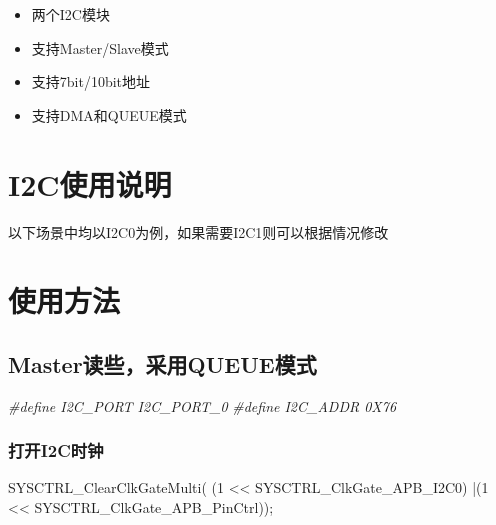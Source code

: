 \documentclass[
  12pt,
]{book}
\newenvironment{Shaded}{\begin{snugshade}}{\end{snugshade}}
\newcommand{\DecValTok}[1]{\textcolor[rgb]{0.00,0.00,0.81}{#1}}
\newcommand{\NormalTok}[1]{#1}
\newcommand{\PreprocessorTok}[1]{\textcolor[rgb]{0.56,0.35,0.01}{\textit{#1}}}
\providecommand{\tightlist}{%
  \setlength{\itemsep}{0pt}\setlength{\parskip}{0pt}}
\begin{document}
\begin{itemize}
\tightlist
\item
  两个I2C模块
\item
  支持Master/Slave模式
\item
  支持7bit/10bit地址
\item
  支持DMA和QUEUE模式
\end{itemize}

\hypertarget{i2cux4f7fux7528ux8bf4ux660e}{%
\section{I2C使用说明}\label{i2cux4f7fux7528ux8bf4ux660e}}

以下场景中均以I2C0为例，如果需要I2C1则可以根据情况修改

\hypertarget{ux4f7fux7528ux65b9ux6cd5}{%
\section{使用方法}\label{ux4f7fux7528ux65b9ux6cd5}}

\hypertarget{masterux8bfbux4e9bux91c7ux7528queueux6a21ux5f0f}{%
\subsection{Master读些，采用QUEUE模式}\label{masterux8bfbux4e9bux91c7ux7528queueux6a21ux5f0f}}

\begin{Shaded}
\begin{Highlighting}[]
\PreprocessorTok{#define I2C_PORT        I2C_PORT_0}
\PreprocessorTok{#define I2C_ADDR        0X76}
\end{Highlighting}
\end{Shaded}

\hypertarget{ux6253ux5f00i2cux65f6ux949f}{%
\subsubsection{打开I2C时钟}\label{ux6253ux5f00i2cux65f6ux949f}}

\begin{Shaded}
\begin{Highlighting}[]
\NormalTok{    SYSCTRL_ClearClkGateMulti( (}\DecValTok{1}\NormalTok{ << SYSCTRL_ClkGate_APB_I2C0)}
\NormalTok{                              |(}\DecValTok{1}\NormalTok{ << SYSCTRL_ClkGate_APB_PinCtrl));}
\end{Highlighting}
\end{Shaded}
\end{document}
